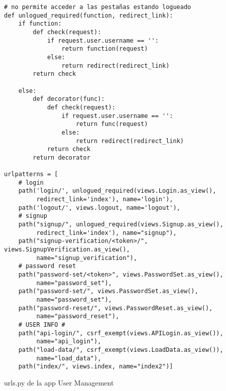 \begin{listing}[H]
\begin{verbatim}
# no permite acceder a las pestañas estando logueado
def unlogued_required(function, redirect_link):
    if function:
        def check(request):
            if request.user.username == '':
                return function(request)
            else:
                return redirect(redirect_link)
        return check

    else:
        def decorator(func):
            def check(request):
                if request.user.username == '':
                    return func(request)
                else:
                    return redirect(redirect_link)
            return check
        return decorator

urlpatterns = [
    # login
    path('login/', unlogued_required(views.Login.as_view(), 
         redirect_link='index'), name='login'),
    path('logout/', views.logout, name='logout'),
    # signup
    path("signup/", unlogued_required(views.Signup.as_view(), 
         redirect_link='index'), name="signup"),
    path("signup-verification/<token>/", views.SignupVerification.as_view(), 
         name="signup_verification"),
    # password reset
    path("password-set/<token>", views.PasswordSet.as_view(), 
         name="password_set"),
    path("password-set/", views.PasswordSet.as_view(), 
         name="password_set"),
    path("password-reset/", views.PasswordReset.as_view(), 
         name="password_reset"),
    # USER INFO #
    path("api-login/", csrf_exempt(views.APILogin.as_view()), 
         name="api_login"),
    path("load-data/", csrf_exempt(views.LoadData.as_view()),
         name="load_data"),
    path("index/", views.index, name="index2")]
\end{verbatim}
\caption{urls.py de la app User Management}
\label{urls.py_user_mngmnt}
\end{listing}



